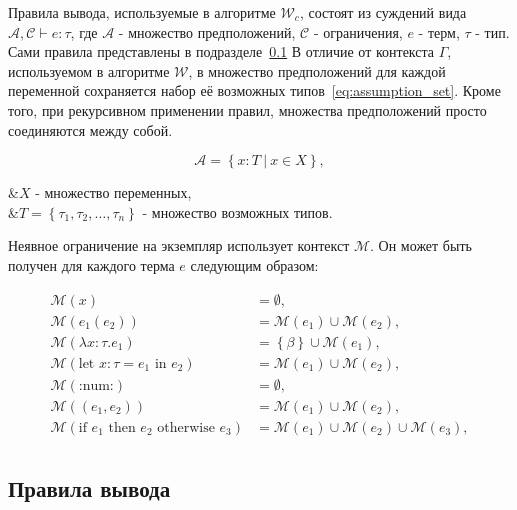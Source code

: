 Правила вывода, используемые в алгоритме $\mathcal{W}_c$, состоят из суждений вида $\mathcal{A}, \mathcal{C} \vdash e: \tau$, где $\mathcal{A}$ - множество предположений, $\mathcal{C}$ - ограничения, $e$ - терм, $\tau$ - тип.
Сами правила представлены в подразделе~\ref{subsec:inference_rules}
В отличие от контекста $\Gamma$, используемом в алгоритме $\mathcal{W}$, в множество предположений для каждой переменной сохраняется набор её возможных типов~\eqref{eq:assumption_set}.
Кроме того, при рекурсивном применении правил, множества предположений просто соединяются между собой.

\begin{equation}
    \label{eq:assumption_set}
    \mathcal{A} = \left\{ x: T ~|~ x \in X \right\},
\end{equation}
\begin{eqrem}
    &$X$ - множество переменных,\\
    &$T = \left\{ \tau_1, \tau_2, \ldots, \tau_n \right\}$ - множество возможных типов.\\
\end{eqrem}

Неявное ограничение на экземпляр использует контекст $\mathcal{M}$.
Он может быть получен для каждого терма $e$ следующим образом:

\begin{equation}
    \label{eq:monomorphic_set}
    \begin{aligned}
        \mathcal{M}(x) &= \emptyset, \\
        \mathcal{M}(e_1(e_2)) &= \mathcal{M}(e_1) \cup \mathcal{M}(e_2), \\
        \mathcal{M}(\lambda x: \tau. e_1) &= \left\{ \beta \right\} \cup \mathcal{M}(e_1), \\
        \mathcal{M}(\text{let } x: \tau = e_1 \text{ in } e_2) &= \mathcal{M}(e_1) \cup \mathcal{M}(e_2), \\
        \mathcal{M}(\text{:num:}) &= \emptyset, \\
        \mathcal{M}((e_1, e_2)) &= \mathcal{M}(e_1) \cup \mathcal{M}(e_2), \\
        \mathcal{M}(\text{if } e_1 \text{ then } e_2 \text{ otherwise } e_3) &= \mathcal{M}(e_1) \cup \mathcal{M}(e_2) \cup \mathcal{M}(e_3), \\
    \end{aligned}
\end{equation}

\subsection{Правила вывода}
\label{subsec:inference_rules}

